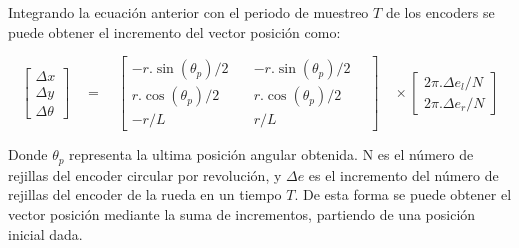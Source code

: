 Integrando la ecuación anterior con el periodo de muestreo $T$ de los encoders se puede obtener el incremento del vector posición como:

\begin{equation}
\label{eq:CineDirectoDelta}
\begin{bmatrix} \Delta x \\ \Delta y \\ \Delta \theta  \end{bmatrix}\quad =\quad \begin{bmatrix} -r.\sin { ({ \theta  }_{ p })/2\quad  }  & -r.\sin { ({ \theta  }_{ p })/2\quad  }  \\ r.\cos { ({ \theta  }_{ p })/2 }  & r.\cos { ({ \theta  }_{ p })/2 }  \\ -r/L & r/L \end{bmatrix}\quad \times \begin{bmatrix} { 2\pi .\Delta e }_{ l }/N \\ { 2\pi .\Delta e }_{ r }/N \end{bmatrix}
\end{equation}

Donde ${ \theta  }_{ p }$ representa la ultima posición angular obtenida. N es el número de rejillas del encoder circular por revolución, y $\Delta e$ es el incremento del número de rejillas del encoder de la rueda en un tiempo $T$. De esta forma se puede obtener el vector posición mediante la suma de incrementos, partiendo de una posición inicial dada.







